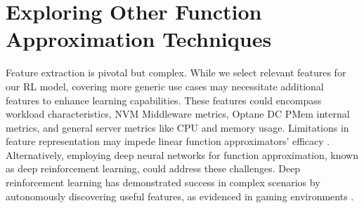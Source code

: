 \section*{Exploring Other Function Approximation Techniques}

Feature extraction is pivotal but complex. While we select relevant features for our RL model, covering more generic use cases may necessitate additional features to enhance learning capabilities. These features could encompass workload characteristics, NVM Middleware metrics, Optane DC PMem internal metrics, and general server metrics like CPU and memory usage. Limitations in feature representation may impede linear function approximators' efficacy \cite{russel2020ai}. Alternatively, employing deep neural networks for function approximation, known as deep reinforcement learning, could address these challenges. Deep reinforcement learning has demonstrated success in complex scenarios by autonomously discovering useful features, as evidenced in gaming environments \cite{mnih2013playing,silver2017mastering}.